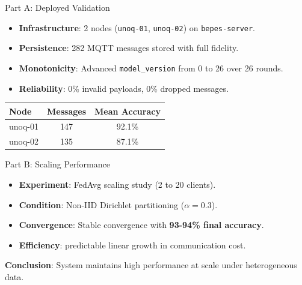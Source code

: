 \documentclass[aspectratio=169, 12pt]{beamer}
\begin{document}
\begin{frame}{Part A: Deployed Validation}
    \begin{itemize}
        \item \textbf{Infrastructure}: 2 nodes (\texttt{unoq-01}, \texttt{unoq-02}) on \texttt{bepes-server}.
        \item \textbf{Persistence}: 282 MQTT messages stored with full fidelity.
        \item \textbf{Monotonicity}: Advanced \texttt{model\_version} from 0 to 26 over 26 rounds.
        \item \textbf{Reliability}: 0\% invalid payloads, 0\% dropped messages.
    \end{itemize}
    \begin{center}
        \begin{table}
            \small
            \begin{tabular}{|l|c|c|}
            \hline
            \textbf{Node} & \textbf{Messages} & \textbf{Mean Accuracy} \\ \hline
            unoq-01 & 147 & 92.1\% \\ \hline
            unoq-02 & 135 & 87.1\% \\ \hline
            \end{tabular}
        \end{table}
    \end{center}
\end{frame}

\begin{frame}{Part B: Scaling Performance}
    \begin{itemize}
        \item \textbf{Experiment}: FedAvg scaling study (2 to 20 clients).
        \item \textbf{Condition}: Non-IID Dirichlet partitioning ($\alpha=0.3$).
        \item \textbf{Convergence}: Stable convergence with \textbf{93-94\% final accuracy}.
        \item \textbf{Efficiency}: predictable linear growth in communication cost.
    \end{itemize}
    \begin{center}
        \begin{tcolorbox}[colback=TrashTeal!5,colframe=TrashTeal, width=0.8\textwidth]
            \centering \textbf{Conclusion}: System maintains high performance at scale under heterogeneous data.
        \end{tcolorbox}
    \end{center}
\end{frame}
\end{document}
